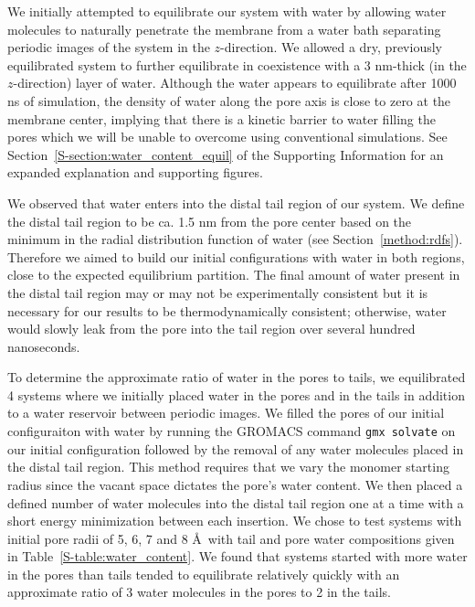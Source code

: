 \documentclass[journal=jpcbfk,manuscript=article]{achemso}
\begin{document}
  We initially attempted to equilibrate our system with water by allowing water
  molecules to naturally penetrate the membrane from a water bath separating
  periodic images of the system in the $z$-direction. We allowed a dry, previously
  equilibrated system to further equilibrate in coexistence with a 3 nm-thick 
  (in the $z$-direction) layer of water. Although the water appears to equilibrate
  after 1000 ns of simulation, the density of water along the pore axis
  is close to zero at the membrane center, implying that there is a kinetic
  barrier to water filling the pores which we will be unable to overcome using
  conventional simulations. See Section~\ref{S-section:water_content_equil} 
  of the Supporting Information for an expanded explanation and supporting figures. 
	  
  We observed that water enters into the distal tail region of our system. We
  define the distal tail region to be ca. 1.5 nm from the pore center based on
  the minimum in the radial distribution function of water (see
  Section~\ref{method:rdfs}). Therefore we aimed to build our initial
  configurations with water in both regions, close to the expected equilibrium
  partition. The final amount of water present in the distal tail region may or
  may not be experimentally consistent but it is necessary for our results to be
  thermodynamically consistent; otherwise, water would slowly leak from the pore
  into the tail region over several hundred nanoseconds. 
	
  To determine the approximate ratio of water in the pores to tails, we
  equilibrated 4 systems where we initially placed water in the pores and in the
  tails in addition to a water reservoir between periodic images. We filled the
  pores of our initial configuraiton with water by running the GROMACS command
  \texttt{gmx solvate} on our initial configuration followed by the removal of
  any water molecules placed in the distal tail region. This method requires that
  we vary the monomer starting radius since the vacant space dictates the pore's
  water content. We then placed a defined number of water molecules into the
  distal tail region one at a time with a short energy minimization between each
  insertion. We chose to test systems with initial pore radii of 5, 6, 7 and 8
  \AA~with tail and pore water compositions given in
  Table~\ref{S-table:water_content}. We found that systems started with more
  water in the pores than tails tended to equilibrate relatively quickly with an
  approximate ratio of 3 water molecules in the pores to 2 in the tails.
\end{document}
